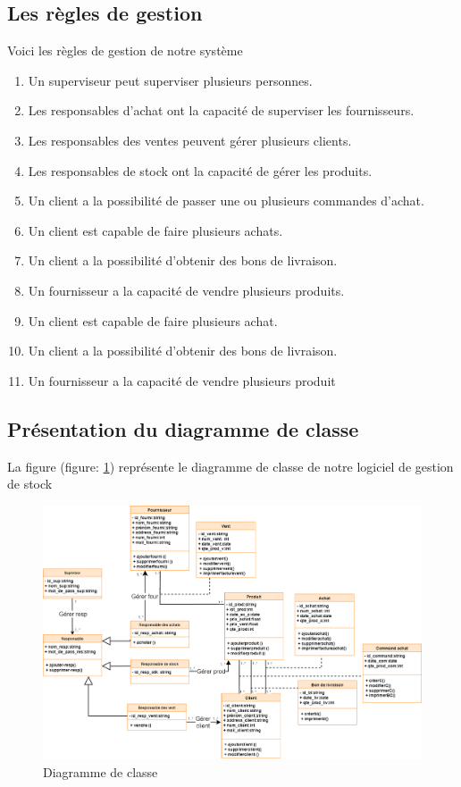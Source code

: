 \documentclass[edit,12pt,a4paper,ChapStyle,oneside,doubleinterligne]{report}
\begin{document}
\subsection{Les règles de gestion}
Voici les règles de gestion de notre système 
\begin{enumerate}
    \item Un superviseur peut superviser plusieurs personnes.
    \item Les responsables d’achat ont la capacité de superviser les fournisseurs.
    \item Les responsables des ventes peuvent gérer plusieurs clients.
    \item Les responsables de stock ont la capacité de gérer les produits.
    \item Un client a la possibilité de passer une ou plusieurs commandes d'achat.
    \item Un client est capable de faire plusieurs achats.
    \item Un client a la possibilité d'obtenir des bons de livraison.
    \item Un fournisseur a la capacité de vendre plusieurs produits.
    \item Un client est capable de faire plusieurs achat.
    \item Un client a la possibilité d'obtenir des bons de livraison.
    \item Un fournisseur a la capacité de vendre plusieurs produit
\end{enumerate}
\clearpage
\subsection{Présentation du diagramme de classe}
La figure (figure: \ref{fig:diag_classl}) représente le diagramme de classe de notre logiciel de gestion de stock 
\begin{figure}[h!]
\centering
\includegraphics[width=1\textwidth]{images/diagramme de class L.png}
\caption{Diagramme de classe}\label{fig:diag_classl}
\end{figure}
\end{document}
